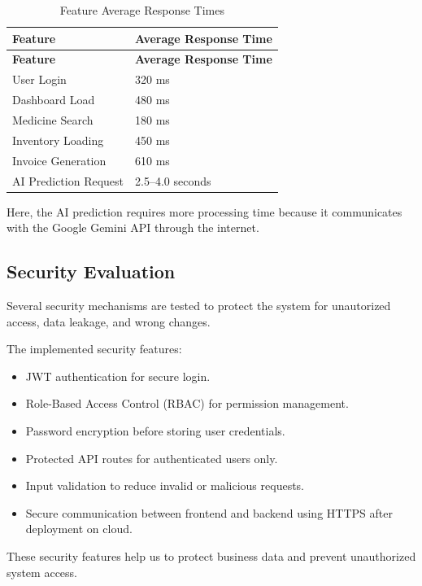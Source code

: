 \small

\begin{longtable}{|p{5cm}|p{9cm}|}
\caption{Feature Average Response Times} \\
\hline
\textbf{Feature} & \textbf{Average Response Time} \\
\hline
\endfirsthead

\hline
\textbf{Feature} & \textbf{Average Response Time} \\
\hline
\endhead

\hline
\endfoot

\hline
\endlastfoot

User Login & 320 ms \\
\hline
Dashboard Load & 480 ms \\
\hline
Medicine Search & 180 ms \\
\hline
Inventory Loading & 450 ms \\
\hline
Invoice Generation & 610 ms \\
\hline
AI Prediction Request & 2.5--4.0 seconds \\
\hline

\end{longtable}

Here, the AI prediction requires more processing time because it communicates with the Google Gemini API through the internet.

\subsection{Security Evaluation}
Several security mechanisms are tested to protect the system for unautorized access, data leakage, and wrong changes.

The implemented security features:
\begin{itemize}
\item JWT authentication for secure login.
\item Role-Based Access Control (RBAC) for permission management.
\item Password encryption before storing user credentials.
\item Protected API routes for authenticated users only.
\item Input validation to reduce invalid or malicious requests.
\item Secure communication between frontend and backend using HTTPS after deployment on cloud.
\end{itemize}

These security features help us to protect business data and prevent unauthorized system access.

